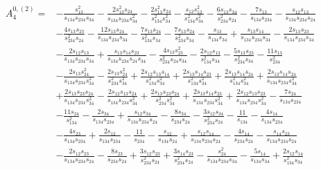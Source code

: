\begin{align}
    A_4^{0,(2)} = {}
          & - \frac{s_{13}^2}{s_{134}s_{234}s_{34}} - \frac{2s_{13}^2s_{24}}{s_{134}s_{234}s_{34}^2} - \frac{2s_{13}^2s_{24}}{s_{134}^2s_{34}^2} - \frac{s_{12}s_{13}^2}{s_{134}^2s_{34}^2} - \frac{6s_{13}s_{34}}{s_{234}^2s_{24}} - \frac{7s_{13}}{s_{134}s_{234}} - \frac{s_{12}s_{13}}{s_{134}s_{234}s_{24}} \nonumber \\
  & - \frac{4s_{13}s_{23}}{s_{234}^2s_{24}} - \frac{12s_{13}s_{24}}{s_{134}s_{234}s_{34}} - \frac{7s_{13}s_{24}}{s_{134}^2s_{34}} - \frac{7s_{13}s_{24}}{s_{234}^2s_{34}} - \frac{s_{13}}{s_{134}s_{34}} + \frac{s_{13}s_{14}}{s_{134}s_{234}s_{34}} - \frac{2s_{13}s_{23}}{s_{134}s_{234}s_{34}} \nonumber \\
  & - \frac{2s_{12}s_{13}}{s_{134}s_{234}s_{34}} + \frac{s_{13}s_{14}s_{23}}{s_{134}s_{234}s_{24}s_{34}} - \frac{4s_{13}s_{23}^2}{s_{234}^2s_{24}s_{34}} - \frac{2s_{12}s_{13}}{s_{134}^2s_{34}} - \frac{5s_{13}s_{23}}{s_{234}^2s_{34}} - \frac{11s_{13}}{s_{234}^2} \nonumber \\
  & - \frac{2s_{13}s_{24}^2}{s_{134}s_{234}s_{34}^2} - \frac{2s_{13}s_{24}^2}{s_{234}^2s_{34}^2} + \frac{2s_{12}s_{13}s_{14}}{s_{134}^2s_{34}^2} + \frac{2s_{13}s_{14}s_{23}}{s_{134}^2s_{34}^2} + \frac{2s_{13}s_{14}s_{24}}{s_{134}^2s_{34}^2} + \frac{2s_{13}s_{14}s_{24}}{s_{134}s_{234}s_{34}^2} \nonumber \\
  & + \frac{2s_{13}s_{23}s_{24}}{s_{134}s_{234}s_{34}^2} - \frac{2s_{12}s_{13}s_{24}}{s_{134}s_{234}s_{34}^2} + \frac{2s_{13}s_{23}s_{24}}{s_{234}^2s_{34}^2} + \frac{2s_{13}s_{14}s_{23}}{s_{134}s_{234}s_{34}^2} + \frac{2s_{12}s_{13}s_{23}}{s_{134}s_{234}s_{34}^2} - \frac{7s_{24}}{s_{134}s_{234}} \nonumber \\
  & - \frac{11s_{24}}{s_{134}^2} - \frac{2s_{34}}{s_{134}s_{234}} + \frac{s_{12}s_{34}}{s_{134}s_{234}s_{24}} - \frac{8s_{34}}{s_{234}s_{24}} - \frac{3s_{12}s_{34}}{s_{234}^2s_{24}} - \frac{11}{s_{134}} - \frac{4s_{14}}{s_{134}s_{234}} \nonumber \\
  & - \frac{4s_{23}}{s_{134}s_{234}} + \frac{2s_{12}}{s_{134}s_{234}} - \frac{11}{s_{234}} - \frac{s_{12}}{s_{134}s_{24}} + \frac{s_{12}s_{14}}{s_{134}s_{234}s_{24}} - \frac{4s_{14}}{s_{234}s_{24}} - \frac{s_{14}s_{23}}{s_{134}s_{234}s_{24}} \nonumber \\
  & - \frac{2s_{12}s_{23}}{s_{134}s_{234}s_{24}} - \frac{8s_{23}}{s_{234}s_{24}} + \frac{3s_{12}s_{23}}{s_{234}^2s_{24}} + \frac{3s_{14}s_{23}}{s_{234}^2s_{24}} - \frac{s_{24}^2}{s_{134}s_{234}s_{34}} - \frac{5s_{14}}{s_{134}s_{34}} + \frac{2s_{12}s_{14}}{s_{134}^2s_{34}} \nonumber \\

\end{align}
